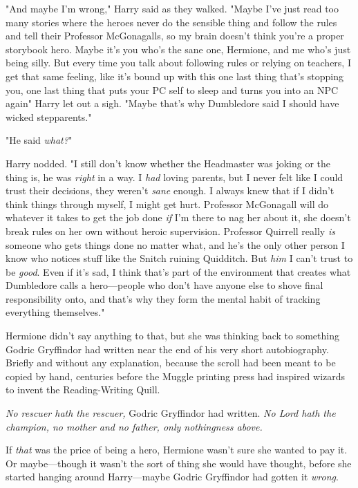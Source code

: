 "And maybe I'm wrong," Harry said as they walked. "Maybe I've just read too
many stories where the heroes never do the sensible thing and follow the rules
and tell their Professor McGonagalls, so my brain doesn't think you're a proper
storybook hero. Maybe it's you who's the sane one, Hermione, and me who's just
being silly. But every time you talk about following rules or relying on
teachers, I get that same feeling, like it's bound up with this one last thing
that's stopping you, one last thing that puts your PC self to sleep and turns
you into an NPC again{\el}" Harry let out a sigh. "Maybe that's why
Dumbledore said I should have wicked stepparents."

"He said \emph{what?}"

Harry nodded. "I still don't know whether the Headmaster was joking or{\el}
the thing is, he was \emph{right} in a way. I \emph{had} loving parents, but I
never felt like I could trust their decisions, they weren't \emph{sane} enough.
I always knew that if I didn't think things through myself, I might get hurt.
Professor McGonagall will do whatever it takes to get the job done \emph{if}
I'm there to nag her about it, she doesn't break rules on her own without
heroic supervision. Professor Quirrell really \emph{is} someone who gets things
done no matter what, and he's the only other person I know who notices stuff
like the Snitch ruining Quidditch. But \emph{him} I can't trust to be
\emph{good}. Even if it's sad, I think that's part of the environment that
creates what Dumbledore calls a hero---people who don't have anyone else to
shove final responsibility onto, and that's why they form the mental habit of
tracking everything themselves."

Hermione didn't say anything to that, but she was thinking back to something
Godric Gryffindor had written near the end of his very short autobiography.
Briefly and without any explanation, because the scroll had been meant to be
copied by hand, centuries before the Muggle printing press had inspired wizards
to invent the Reading-Writing Quill.

\emph{No rescuer hath the rescuer,} Godric Gryffindor had written. \emph{No
Lord hath the champion, no mother and no father, only nothingness above.}

If \emph{that} was the price of being a hero, Hermione wasn't sure she wanted
to pay it. Or maybe---though it wasn't the sort of thing she would have
thought, before she started hanging around Harry---maybe Godric Gryffindor had
gotten it \emph{wrong}.

